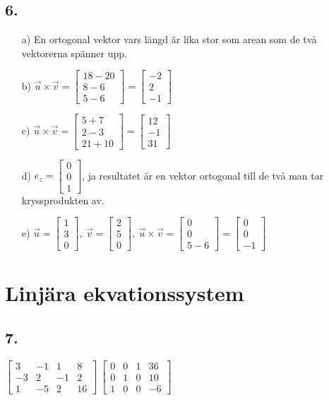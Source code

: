 \documentclass{article}
\begin{document}
\subsection*{6.}
\begin{itemize}
	\item[a) ] En ortogonal vektor vars längd är lika stor som arean som de två vektorerna spänner upp.
	\item[b) ] $\vec{u} \times \vec{v}=\begin{bmatrix}18-20\\8-6\\5-6\end{bmatrix}=\begin{bmatrix}-2\\2\\-1\end{bmatrix}$
	\item[c) ] $\vec{u}\times \vec{v}=\begin{bmatrix}5+7\\2-3\\21+10\end{bmatrix}=\begin{bmatrix}12\\-1\\31\end{bmatrix}$
	\item[d) ] $e_z=\begin{bmatrix}0\\0\\1\end{bmatrix}$, ja resultatet är en vektor ortogonal till de två man tar kryssprodukten av.
	\item[e) ] $\vec{u}=\begin{bmatrix}1\\3\\0\end{bmatrix},\ \vec{v}=\begin{bmatrix}2\\5\\0\end{bmatrix},\ 
	\vec{u}\times \vec{v}=\begin{bmatrix}0\\0\\5-6\end{bmatrix}=\begin{bmatrix}0\\0\\-1\end{bmatrix}$
\end{itemize}

\section*{Linjära ekvationssystem}
\subsection*{7.}
$\begin{bmatrix}
3 &-1 &1 & 8 \\
-3 &2 &-1 &2 \\
1 &-5 &2 & 16
\end{bmatrix}~
\begin{bmatrix}
0 &0 &1 &36\\
0 &1 &0 &10\\
1 &0 &0 &-6
\end{bmatrix}$
\end{document}
